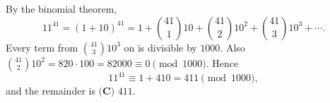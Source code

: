 By the binomial theorem,
\[
11^{41}=(1+10)^{41}=1+\binom{41}{1}10+\binom{41}{2}10^2+\binom{41}{3}10^3+\cdots .
\]
Every term from $\binom{41}{3}10^3$ on is divisible by $1000$. Also $\binom{41}{2}10^2=820\cdot100=82000\equiv0\pmod{1000}$. Hence
\[
11^{41}\equiv1+410=411\pmod{1000},
\]
and the remainder is $\boxed{\textbf{(C) }411}$.
